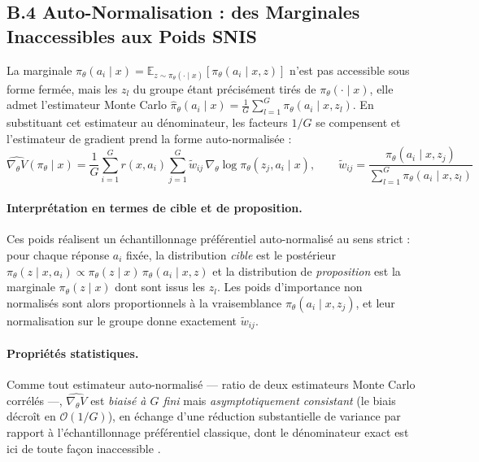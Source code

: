 \documentclass[11pt,a4paper]{article}
\begin{document}
\subsection*{B.4 Auto-Normalisation : des Marginales Inaccessibles aux Poids SNIS}
La marginale $\pi_\theta(a_i \mid x) = \mathbb{E}_{z \sim \pi_\theta(\cdot \mid x)}[\pi_\theta(a_i \mid x, z)]$ n'est pas accessible sous forme fermée, mais les $z_l$ du groupe étant précisément tirés de $\pi_\theta(\cdot \mid x)$, elle admet l'estimateur Monte Carlo $\hat{\pi}_\theta(a_i \mid x) = \frac{1}{G} \sum_{l=1}^G \pi_\theta(a_i \mid x, z_l)$. En substituant cet estimateur au dénominateur, les facteurs $1/G$ se compensent et l'estimateur de gradient prend la forme auto-normalisée :
\begin{equation}
\widehat{\nabla_\theta V}(\pi_\theta \mid x) = \frac{1}{G} \sum_{i=1}^G r(x, a_i) \sum_{j=1}^G \tilde{w}_{ij} \, \nabla_\theta \log \pi_\theta(z_j, a_i \mid x),
\qquad
\tilde{w}_{ij} = \frac{\pi_\theta(a_i \mid x, z_j)}{\sum_{l=1}^G \pi_\theta(a_i \mid x, z_l)}
\end{equation}

\paragraph{Interprétation en termes de cible et de proposition.} Ces poids réalisent un échantillonnage préférentiel auto-normalisé au sens strict : pour chaque réponse $a_i$ fixée, la distribution \emph{cible} est le postérieur $\pi_\theta(z \mid x, a_i) \propto \pi_\theta(z \mid x)\, \pi_\theta(a_i \mid x, z)$ et la distribution de \emph{proposition} est la marginale $\pi_\theta(z \mid x)$ dont sont issus les $z_l$. Les poids d'importance non normalisés sont alors proportionnels à la vraisemblance $\pi_\theta(a_i \mid x, z_j)$, et leur normalisation sur le groupe donne exactement $\tilde{w}_{ij}$.

\paragraph{Propriétés statistiques.} Comme tout estimateur auto-normalisé — ratio de deux estimateurs Monte Carlo corrélés —, $\widehat{\nabla_\theta V}$ est \emph{biaisé à $G$ fini} mais \emph{asymptotiquement consistant} (le biais décroît en $\mathcal{O}(1/G)$), en échange d'une réduction substantielle de variance par rapport à l'échantillonnage préférentiel classique, dont le dénominateur exact est ici de toute façon inaccessible \cite[chap.~9]{owen2013montecarlo}.
\end{document}
